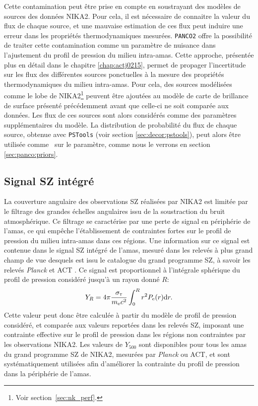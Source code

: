 Cette contamination peut être prise en compte en soustrayant des modèles de sources des données NIKA2.
Pour cela, il est nécessaire de connaitre la valeur du flux de chaque source, et une mauvaise estimation de ces flux peut induire une erreur dans les propriétés thermodynamiques mesurées.
\texttt{PANCO2} offre la possibilité de traiter cette contamination comme un paramètre de nuisance dans l'ajustement du profil de pression du milieu intra-amas.
Cette approche, présentée plus en détail dans le chapitre \ref{chap:actj0215}, permet de propager l'incertitude sur les flux des différentes sources ponctuelles à la mesure des propriétés thermodynamiques du milieu intra-amas.
Pour cela, des sources modélisées comme le lobe de NIKA2\footnote{Voir section~\ref{sec:nk_perf}.} peuvent être ajoutées au modèle de carte de brillance de surface présenté précédemment avant que celle-ci ne soit comparée aux données.
Les flux de ces sources sont alors considérés comme des paramètres supplémentaires du modèle.
La distribution de probabilité du flux de chaque source, obtenue avec \texttt{PSTools} (voir section \ref{sec:decor:pstools}), peut alors être utilisée comme \prior\ sur le paramètre, comme nous le verrons en section \ref{sec:panco:priors}.

\subsection{Signal SZ intégré}

La couverture angulaire des observations SZ réalisées par NIKA2 est limitée par le filtrage des grandes échelles angulaires issu de la soustraction du bruit atmosphérique.
Ce filtrage se caractérise par une perte de signal en périphérie de l'amas, ce qui empêche l'établissement de contraintes fortes sur le profil de pression du milieu intra-amas dans ces régions.
Une information sur ce signal est contenue dans le signal SZ intégré de l'amas, mesuré dans les relevés à plus grand champ de vue desquels est issu le catalogue du grand programme SZ, à savoir les relevés \textit{Planck} \cite{planck_collaboration_planck_2016-3} et ACT \cite{hasselfield_atacama_2013}.
Ce signal est proportionnel à l'intégrale sphérique du profil de pression considéré jusqu'à un rayon donné $R$:
\begin{equation}
    Y_R = 4 \pi \frac{\sigma_\textsc{t}}{m_{\rm e} c^2} \int_0^R r^2 P_{\rm e}(r) \mathrm{d} r.
\end{equation}
Cette valeur peut donc être calculée à partir du modèle de profil de pression considéré, et comparée aux valeurs reportées dans les relevés SZ, imposant une contrainte effective sur le profil de pression dans les régions non contraintes par les observations NIKA2.
Les valeurs de $Y_{500}$ sont disponibles pour tous les amas du grand programme SZ de NIKA2, mesurées par \textit{Planck} ou ACT, et sont systématiquement utilisées afin d'améliorer la contrainte du profil de pression dans la périphérie de l'amas.

